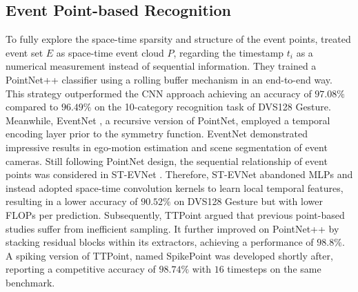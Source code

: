 \subsection{Event Point-based Recognition}
To fully explore the space-time sparsity and structure of the event points, \cite{wang2019space} treated event set $E$ as space-time event cloud $P$, regarding the timestamp $t_i$ as a numerical measurement instead of sequential information. They trained a PointNet++ classifier using a rolling buffer mechanism in an end-to-end way. This strategy outperformed the CNN approach \cite{amir2017low} achieving an accuracy of $97.08\%$ compared to $96.49\%$ on the 10-category recognition task of DVS128 Gesture. Meanwhile, EventNet \cite{sekikawa2019eventnet}, a recursive version of PointNet, employed a temporal encoding layer prior to the symmetry function. EventNet demonstrated impressive results in ego-motion estimation and scene segmentation of event cameras. Still following PointNet design, the sequential relationship of event points was considered in ST-EVNet \cite{wang2020st}. Therefore, ST-EVNet abandoned MLPs and instead adopted space-time convolution kernels to learn local temporal features, resulting in a lower accuracy of $90.52\%$ on DVS128 Gesture but with lower FLOPs per prediction. Subsequently, TTPoint \cite{ren2023ttpoint} argued that previous point-based studies suffer from inefficient sampling. It further improved on PointNet++ by stacking residual blocks within its extractors, achieving a performance of $98.8\%$. A spiking version of TTPoint, named SpikePoint \cite{ren2023spikepoint} was developed shortly after, reporting a competitive accuracy of $98.74\%$ with $16$ timesteps on the same benchmark.
